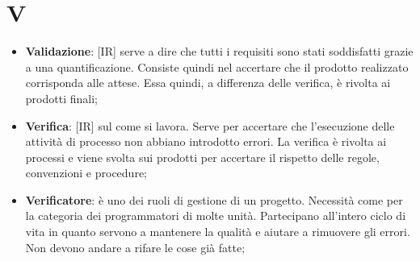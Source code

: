 %
%
%

\section{V}

\begin{itemize}
	\item \textbf{Validazione}: [IR] serve a dire che tutti i requisiti sono stati soddisfatti grazie a una quantificazione. Consiste quindi nel accertare che il prodotto realizzato corrisponda alle attese. Essa quindi, a differenza delle verifica, è rivolta ai prodotti finali;
	\item \textbf{Verifica}: [IR] sul come si lavora. Serve per accertare che l'esecuzione delle attività di processo non abbiano introdotto errori. La verifica è rivolta ai processi e viene svolta sui prodotti per accertare il rispetto delle regole, convenzioni e procedure;
	\item \textbf{Verificatore}: è uno dei ruoli di gestione di un progetto. Necessità come per la categoria dei programmatori di molte unità. Partecipano all'intero ciclo di vita in quanto servono a mantenere la qualità e aiutare a rimuovere gli errori. Non devono andare a rifare le cose già fatte;

\end{itemize}